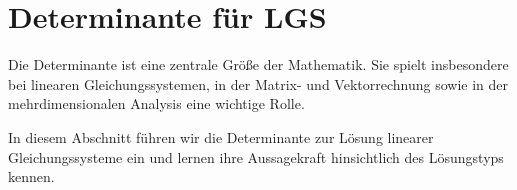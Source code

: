 \section{Determinante für LGS}
\label{sec:linear_systems_determinants}

Die Determinante ist eine zentrale Größe der Mathematik. Sie spielt insbesondere
bei linearen Gleichungssystemen, in der Matrix- und Vektorrechnung sowie in der
mehrdimensionalen Analysis eine wichtige Rolle.

In diesem Abschnitt führen wir die Determinante zur Lösung linearer
Gleichungssysteme ein und lernen ihre Aussagekraft hinsichtlich des Lösungstyps
kennen.






